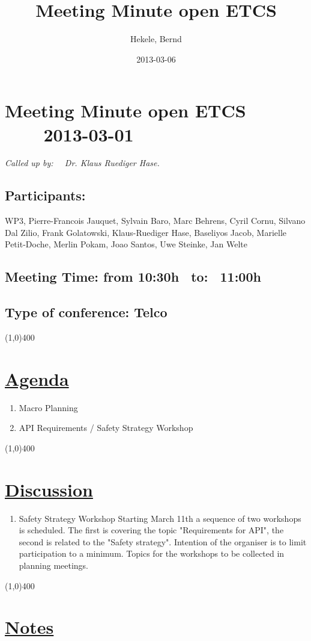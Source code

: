 \documentclass[a4paper]{article}
\title{Meeting Minute open ETCS}
\author{Hekele, Bernd}
\date{2013-03-06}
\begin{document}
\section*{\large{Meeting Minute open ETCS \ \ \ \ 2013-03-01}}

\large{\emph{Called up by: \ \  Dr. Klaus Ruediger Hase.}}

\subsection*{Participants:} WP3, Pierre-Francois Jauquet, Sylvain Baro, Marc Behrens, Cyril Cornu, Silvano Dal Zilio, Frank Golatowski, Klaus-Ruediger Hase, Baseliyos Jacob, Marielle Petit-Doche, Merlin Pokam, Joao Santos, Uwe Steinke, Jan Welte\\

\subsection*{Meeting Time: from 10:30h \ to: \ 11:00h}

\subsection*{Type of conference: Telco}

\line(1,0){400}
\section*{\underline{Agenda}}
\begin{enumerate}
\item Macro Planning
\item API Requirements / Safety Strategy Workshop
\end{enumerate}
\line(1,0){400}
\section*{\underline{Discussion}}

\begin{enumerate}

\item Safety Strategy Workshop\newline
Starting March 11th a sequence of two workshops is scheduled. The first is covering the topic "Requirements for API", the second is related to the "Safety strategy". Intention of the organiser is to limit participation to a minimum. Topics for the workshops to be collected in planning meetings. 

\end{enumerate}

\line(1,0){400}
\section*{\underline{Notes}}
\end{document}
